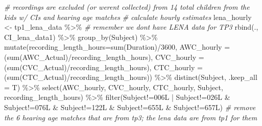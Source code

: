 \documentclass[
]{article}
\newenvironment{Shaded}{\begin{snugshade}}{\end{snugshade}}
\newcommand{\AttributeTok}[1]{\textcolor[rgb]{0.77,0.63,0.00}{#1}}
\newcommand{\CommentTok}[1]{\textcolor[rgb]{0.56,0.35,0.01}{\textit{#1}}}
\newcommand{\DecValTok}[1]{\textcolor[rgb]{0.00,0.00,0.81}{#1}}
\newcommand{\FunctionTok}[1]{\textcolor[rgb]{0.00,0.00,0.00}{#1}}
\newcommand{\NormalTok}[1]{#1}
\newcommand{\OtherTok}[1]{\textcolor[rgb]{0.56,0.35,0.01}{#1}}
\newcommand{\SpecialCharTok}[1]{\textcolor[rgb]{0.00,0.00,0.00}{#1}}
\newcommand{\StringTok}[1]{\textcolor[rgb]{0.31,0.60,0.02}{#1}}
\begin{document}
\begin{Shaded}
\begin{Highlighting}[]
\CommentTok{\# recordings are excluded (or weren\textquotesingle{}t collected) from 14 total children from the kids w/ CIs and hearing age matches }
\CommentTok{\# calculate hourly estimates }
\NormalTok{lena\_hourly }\OtherTok{\textless{}{-}}\NormalTok{ tp1\_lena\_data }\SpecialCharTok{\%\textgreater{}\%} \CommentTok{\# remember we don\textquotesingle{}t have LENA data for TP3}
  \FunctionTok{rbind}\NormalTok{(., CI\_lena\_data1) }\SpecialCharTok{\%\textgreater{}\%}
  \FunctionTok{group\_by}\NormalTok{(Subject) }\SpecialCharTok{\%\textgreater{}\%}
  \FunctionTok{mutate}\NormalTok{(}\AttributeTok{recording\_length\_hours=}\FunctionTok{sum}\NormalTok{(Duration)}\SpecialCharTok{/}\DecValTok{3600}\NormalTok{,}
         \AttributeTok{AWC\_hourly =}\NormalTok{ (}\FunctionTok{sum}\NormalTok{(AWC\_Actual)}\SpecialCharTok{/}\NormalTok{recording\_length\_hours),}
         \AttributeTok{CVC\_hourly =}\NormalTok{ (}\FunctionTok{sum}\NormalTok{(CVC\_Actual)}\SpecialCharTok{/}\NormalTok{recording\_length\_hours),}
         \AttributeTok{CTC\_hourly =}\NormalTok{ (}\FunctionTok{sum}\NormalTok{(CTC\_Actual)}\SpecialCharTok{/}\NormalTok{recording\_length\_hours)) }\SpecialCharTok{\%\textgreater{}\%}
  \FunctionTok{distinct}\NormalTok{(Subject, }\AttributeTok{.keep\_all =}\NormalTok{ T) }\SpecialCharTok{\%\textgreater{}\%}
  \FunctionTok{select}\NormalTok{(AWC\_hourly, CVC\_hourly, CTC\_hourly, Subject, recording\_length\_hours) }\SpecialCharTok{\%\textgreater{}\%}
  \FunctionTok{filter}\NormalTok{(Subject}\SpecialCharTok{!=}\StringTok{\textquotesingle{}006L\textquotesingle{}} \SpecialCharTok{|}\NormalTok{ Subject}\SpecialCharTok{!=}\StringTok{\textquotesingle{}026L\textquotesingle{}} \SpecialCharTok{\&}\NormalTok{ Subject}\SpecialCharTok{!=}\StringTok{\textquotesingle{}076L\textquotesingle{}} \SpecialCharTok{\&}
\NormalTok{           Subject}\SpecialCharTok{!=}\StringTok{\textquotesingle{}122L\textquotesingle{}} \SpecialCharTok{\&}\NormalTok{ Subject}\SpecialCharTok{!=}\StringTok{\textquotesingle{}655L\textquotesingle{}} \SpecialCharTok{\&}\NormalTok{ Subject}\SpecialCharTok{!=}\StringTok{\textquotesingle{}657L\textquotesingle{}}\NormalTok{) }\CommentTok{\# remove the 6 hearing age matches that are from tp3; the lena data are from tp1 for them}


\end{Highlighting}
\end{Shaded}
\end{document}
